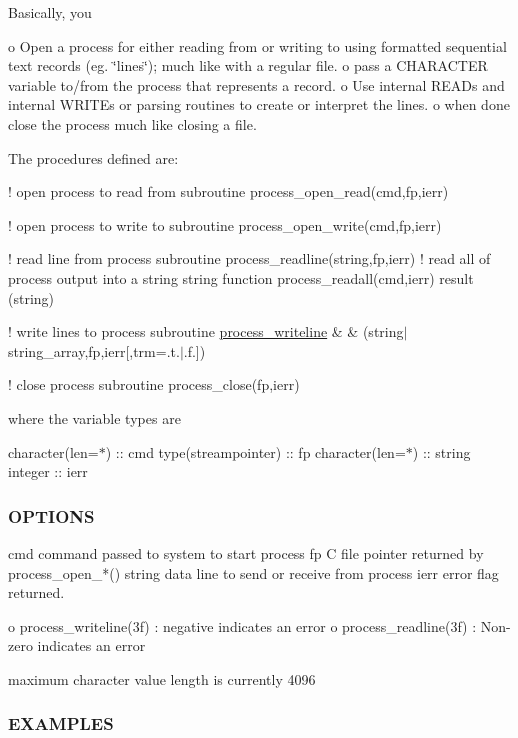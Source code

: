 Basically, you

o Open a process for either reading from or writing to using formatted sequential text records (eg. \char`\"{}lines\char`\"{}); much like with a regular file. o pass a C\+H\+A\+R\+A\+C\+T\+ER variable to/from the process that represents a record. o Use internal R\+E\+A\+Ds and internal W\+R\+I\+T\+Es or parsing routines to create or interpret the lines. o when done close the process much like closing a file.

The procedures defined are\+:

! open process to read from subroutine process\+\_\+open\+\_\+read(cmd,fp,ierr)

! open process to write to subroutine process\+\_\+open\+\_\+write(cmd,fp,ierr)

! read line from process subroutine process\+\_\+readline(string,fp,ierr) ! read all of process output into a string string function process\+\_\+readall(cmd,ierr) result (string)

! write lines to process subroutine \mbox{\hyperlink{interfacem__process_1_1process__writeline}{process\+\_\+writeline}} \& \& (string$\vert$string\+\_\+array,fp,ierr\mbox{[},trm=.t.$\vert$.f.\mbox{]})

! close process subroutine process\+\_\+close(fp,ierr)

where the variable types are

character(len=$\ast$) \+:\+: cmd type(streampointer) \+:\+: fp character(len=$\ast$) \+:\+: string integer \+:\+: ierr

\subsubsection*{O\+P\+T\+I\+O\+NS}

\begin{DoxyVerb}cmd      command passed to system to start process
fp       C file pointer returned by process_open_*()
string   data line to send or receive from process
ierr     error flag returned.

          o process_writeline(3f) : negative indicates an error
          o process_readline(3f)  : Non-zero indicates an error

maximum character value length is currently 4096
\end{DoxyVerb}


\subsubsection*{E\+X\+A\+M\+P\+L\+ES}

